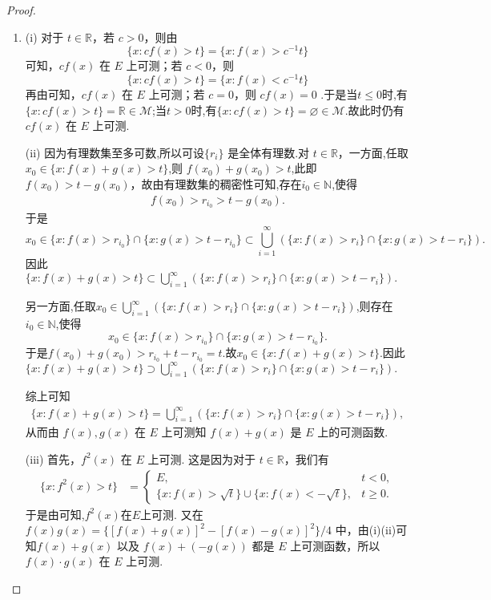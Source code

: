 \documentclass[../../main.tex]{subfiles}
\begin{document}
\begin{proof}
\begin{enumerate}[(1)]
\item (i) 对于 \(t \in \mathbb{R}\)，若 \(c > 0\)，则由
\[
\{x: cf(x) > t\} = \{x: f(x) > c^{-1}t\}
\]
可知，\(cf(x)\) 在 \(E\) 上可测；若 \(c < 0\)，则
\[
\{x: cf(x) > t\} = \{x: f(x) < c^{-1}t\}
\]
再由可知，\(cf(x)\) 在 \(E\) 上可测；若 \(c = 0\)，则 \(cf(x) = 0\) .于是当$t\leq 0$时,有
$\{x:cf(x)>t\}=\mathbb{R}\in \mathscr{M}$;当$t>0$时,有$\{x:cf(x)>t\}=\varnothing\in \mathscr{M}$.故此时仍有\(cf(x)\) 在 \(E\) 上可测.

(ii) 因为有理数集至多可数,所以可设\(\{r_i\}\) 是全体有理数.对 \(t \in \mathbb{R}\)，一方面,任取$x_0\in \{x: f(x) + g(x) > t\}$,则 \(f(x_0) + g(x_0) > t\),此即 \(f(x_0) > t - g(x_0)\)，故由有理数集的稠密性可知,存在$i_0\in\mathbb{N}$,使得
\begin{align*}
f(x_0)>r_{i_0}>t-g(x_0).
\end{align*}
于是$$x_0\in \{x:f(x)>r_{i_0}\}\cap \{x: g(x) > t - r_{i_0}\}\subset \bigcup_{i = 1}^{\infty}(\{x: f(x) > r_i\} \cap \{x: g(x) > t - r_i\}).$$因此$\{x: f(x) + g(x) > t\} 
\subset \bigcup_{i = 1}^{\infty}(\{x: f(x) > r_i\} \cap \{x: g(x) > t - r_i\}).$

另一方面,任取$x_0\in  \bigcup_{i = 1}^{\infty}(\{x: f(x) > r_i\} \cap \{x: g(x) > t - r_i\})$,则存在$i_0\in \mathbb{N}$,使得
\[
x_0\in\{x:f(x)>r_{i_0}\}\cap \{x: g(x) > t - r_{i_0}\}.
\]
于是$f(x_0)+g(x_0)>r_{i_0}+t-r_{i_0}=t$.故$x_0\in \{x: f(x) + g(x) > t\} $.因此$\{x: f(x) + g(x) > t\} 
\supset \bigcup_{i = 1}^{\infty}(\{x: f(x) > r_i\} \cap \{x: g(x) > t - r_i\}).$

综上可知
\begin{align*}
\{x: f(x) + g(x) > t\} 
= \bigcup_{i = 1}^{\infty}(\{x: f(x) > r_i\} \cap \{x: g(x) > t - r_i\}),
\end{align*}
从而由 \(f(x),g(x)\) 在 \(E\) 上可测知 \(f(x) + g(x)\) 是 \(E\) 上的可测函数.

(iii) 首先，\(f^2(x)\) 在 \(E\) 上可测. 这是因为对于 \(t \in \mathbb{R}\)，我们有
\begin{align*}
\{x: f^2(x) > t\} 
&= 
\begin{cases}
E, & t < 0,\\
\{x: f(x) > \sqrt{t}\} \cup \{x: f(x) < -\sqrt{t}\}, & t \geqslant 0.
\end{cases}
\end{align*}
于是由可知,$f^2(x)$在$E$上可测.
又在 \(f(x)g(x) = \{[f(x) + g(x)]^2 - [f(x) - g(x)]^2\}/4\) 中，由(i)(ii)可知\(f(x) + g(x)\) 以及 \(f(x) + (-g(x))\) 都是 \(E\) 上可测函数，所以 \(f(x)\cdot g(x)\) 在 \(E\) 上可测.


\end{enumerate}
\end{proof}
\end{document}
